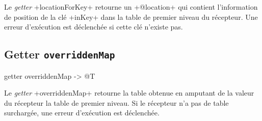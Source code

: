 Le \emph{getter} \ggst+locationForKey+ retourne un \ggst+@location+ qui contient l'information de position de la clé \ggst+inKey+ dans la table de premier niveau du récepteur. Une erreur d'exécution est déclenchée si cette clé n'existe pas.








\subsection{Getter \texttt{overriddenMap}}

\begin{galgas3}
getter overriddenMap -> @T
\end{galgas3}


Le \emph{getter} \ggst+overriddenMap+ retourne la table obtenue en amputant de la valeur du récepteur la table de premier niveau. Si le récepteur n'a pas de table surchargée, une erreur d'exécution est déclenchée.









%
%
%
%
%
%
%
%
%
%
%




